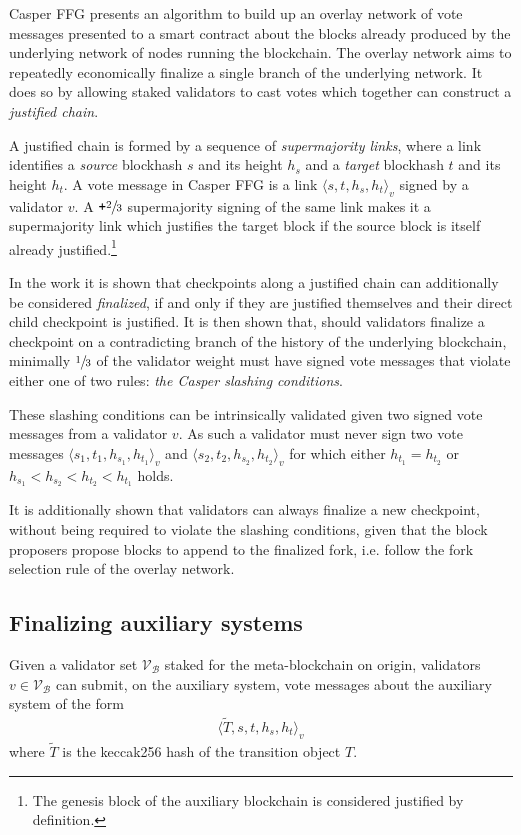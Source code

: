 \documentclass[12pt,a4paper]{article}
\begin{document}
Casper FFG presents an algorithm to build up an overlay network of vote messages presented to a smart contract about the blocks already produced by the underlying network of nodes running the blockchain.
The overlay network aims to repeatedly economically finalize a single branch of the underlying network.
It does so by allowing staked validators to cast votes which together can construct a \emph{justified chain}.

A justified chain is formed by a sequence of \emph{supermajority links}, where a link identifies a \emph{source} blockhash $s$ and its height $h_s$ and a \emph{target} blockhash $t$ and its height $h_t$.
A vote message in Casper FFG is a link $\langle s, t, h_s, h_t\rangle_v$ signed by a validator $v$.
A $\texttt{+}\sfrac{2}{3}$ supermajority signing of the same link makes it a supermajority link which justifies the target block if the source block is itself already justified.\footnote{
	The genesis block of the auxiliary blockchain is considered justified by definition.
}

In the work it is shown that checkpoints along a justified chain can additionally be considered \emph{finalized}, if and only if they are justified themselves and their direct child checkpoint is justified.
It is then shown that, should validators finalize a checkpoint on a contradicting branch of the history of the underlying blockchain, minimally $\sfrac{1}{3}$ of the validator weight must have signed vote messages that violate either one of two rules: \emph{the Casper slashing conditions}.

These slashing conditions can be intrinsically validated given two signed vote messages from a validator $v$.
As such a validator must never sign two vote messages $\langle s_1, t_1, h_{s_1}, h_{t_1}\rangle_v$ and $\langle s_2, t_2, h_{s_2}, h_{t_2}\rangle_v$ for which either $h_{t_1} = h_{t_2}$ or $h_{s_1} < h_{s_2} < h_{t_2} < h_{t_1}$ holds.

It is additionally shown that validators can always finalize a new checkpoint, without being required to violate the slashing conditions, given that the block proposers propose blocks to append to the finalized fork, i.e. follow the fork selection rule of the overlay network.

\subsection{Finalizing auxiliary systems}
Given a validator set $\mathcal{V}_\mathcal{B}$ staked for the meta-blockchain on origin, validators $v \in \mathcal{V}_\mathcal{B}$ can submit, on the auxiliary system, vote messages about the auxiliary system of the form
\begin{align}\label{externalizedvote}
  \langle \tilde{T}, s, t, h_s, h_t \rangle_v
\end{align}
where $\tilde{T}$ is the keccak256 hash of the transition object $T$.
\end{document}
